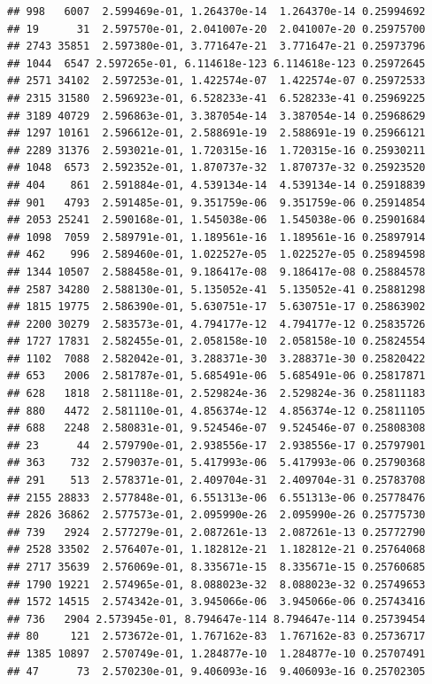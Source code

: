 \documentclass[
]{article}
\begin{document}
\begin{verbatim}
## 998   6007  2.599469e-01, 1.264370e-14  1.264370e-14 0.25994692
## 19      31  2.597570e-01, 2.041007e-20  2.041007e-20 0.25975700
## 2743 35851  2.597380e-01, 3.771647e-21  3.771647e-21 0.25973796
## 1044  6547 2.597265e-01, 6.114618e-123 6.114618e-123 0.25972645
## 2571 34102  2.597253e-01, 1.422574e-07  1.422574e-07 0.25972533
## 2315 31580  2.596923e-01, 6.528233e-41  6.528233e-41 0.25969225
## 3189 40729  2.596863e-01, 3.387054e-14  3.387054e-14 0.25968629
## 1297 10161  2.596612e-01, 2.588691e-19  2.588691e-19 0.25966121
## 2289 31376  2.593021e-01, 1.720315e-16  1.720315e-16 0.25930211
## 1048  6573  2.592352e-01, 1.870737e-32  1.870737e-32 0.25923520
## 404    861  2.591884e-01, 4.539134e-14  4.539134e-14 0.25918839
## 901   4793  2.591485e-01, 9.351759e-06  9.351759e-06 0.25914854
## 2053 25241  2.590168e-01, 1.545038e-06  1.545038e-06 0.25901684
## 1098  7059  2.589791e-01, 1.189561e-16  1.189561e-16 0.25897914
## 462    996  2.589460e-01, 1.022527e-05  1.022527e-05 0.25894598
## 1344 10507  2.588458e-01, 9.186417e-08  9.186417e-08 0.25884578
## 2587 34280  2.588130e-01, 5.135052e-41  5.135052e-41 0.25881298
## 1815 19775  2.586390e-01, 5.630751e-17  5.630751e-17 0.25863902
## 2200 30279  2.583573e-01, 4.794177e-12  4.794177e-12 0.25835726
## 1727 17831  2.582455e-01, 2.058158e-10  2.058158e-10 0.25824554
## 1102  7088  2.582042e-01, 3.288371e-30  3.288371e-30 0.25820422
## 653   2006  2.581787e-01, 5.685491e-06  5.685491e-06 0.25817871
## 628   1818  2.581118e-01, 2.529824e-36  2.529824e-36 0.25811183
## 880   4472  2.581110e-01, 4.856374e-12  4.856374e-12 0.25811105
## 688   2248  2.580831e-01, 9.524546e-07  9.524546e-07 0.25808308
## 23      44  2.579790e-01, 2.938556e-17  2.938556e-17 0.25797901
## 363    732  2.579037e-01, 5.417993e-06  5.417993e-06 0.25790368
## 291    513  2.578371e-01, 2.409704e-31  2.409704e-31 0.25783708
## 2155 28833  2.577848e-01, 6.551313e-06  6.551313e-06 0.25778476
## 2826 36862  2.577573e-01, 2.095990e-26  2.095990e-26 0.25775730
## 739   2924  2.577279e-01, 2.087261e-13  2.087261e-13 0.25772790
## 2528 33502  2.576407e-01, 1.182812e-21  1.182812e-21 0.25764068
## 2717 35639  2.576069e-01, 8.335671e-15  8.335671e-15 0.25760685
## 1790 19221  2.574965e-01, 8.088023e-32  8.088023e-32 0.25749653
## 1572 14515  2.574342e-01, 3.945066e-06  3.945066e-06 0.25743416
## 736   2904 2.573945e-01, 8.794647e-114 8.794647e-114 0.25739454
## 80     121  2.573672e-01, 1.767162e-83  1.767162e-83 0.25736717
## 1385 10897  2.570749e-01, 1.284877e-10  1.284877e-10 0.25707491
## 47      73  2.570230e-01, 9.406093e-16  9.406093e-16 0.25702305

\end{verbatim}
\end{document}
